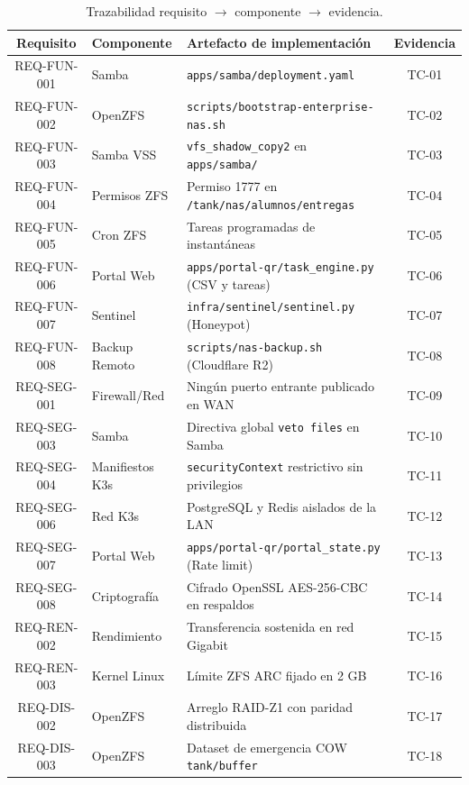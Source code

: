 \documentclass[10pt,a4paper]{article}
\begin{document}
\begin{table}[htbp]
\centering
\small
\caption{Trazabilidad requisito $\to$ componente $\to$ evidencia.}
\label{tab:trazabilidad}
\begin{tabular}{|c|p{2.8cm}|p{6cm}|c|}
\hline
\textbf{\textsf{Requisito}} & \textbf{\textsf{Componente}} & \textbf{\textsf{Artefacto de implementación}} & \textbf{\textsf{Evidencia}} \\
\hline
REQ-FUN-001 & Samba & \texttt{apps/samba/deployment.yaml} & TC-01 \\
\hline
REQ-FUN-002 & OpenZFS & \texttt{scripts/bootstrap-enterprise-nas.sh} & TC-02 \\
\hline
REQ-FUN-003 & Samba VSS & \texttt{vfs\_shadow\_copy2} en \texttt{apps/samba/} & TC-03 \\
\hline
REQ-FUN-004 & Permisos ZFS & Permiso 1777 en \texttt{/tank/nas/alumnos/entregas} & TC-04 \\
\hline
REQ-FUN-005 & Cron ZFS & Tareas programadas de instantáneas & TC-05 \\
\hline
REQ-FUN-006 & Portal Web & \texttt{apps/portal-qr/task\_engine.py} (CSV y tareas) & TC-06 \\
\hline
REQ-FUN-007 & Sentinel & \texttt{infra/sentinel/sentinel.py} (Honeypot) & TC-07 \\
\hline
REQ-FUN-008 & Backup Remoto & \texttt{scripts/nas-backup.sh} (Cloudflare R2) & TC-08 \\
\hline
REQ-SEG-001 & Firewall/Red & Ningún puerto entrante publicado en WAN & TC-09 \\
\hline
REQ-SEG-003 & Samba & Directiva global \texttt{veto files} en Samba & TC-10 \\
\hline
REQ-SEG-004 & Manifiestos K3s & \texttt{securityContext} restrictivo sin privilegios & TC-11 \\
\hline
REQ-SEG-006 & Red K3s & PostgreSQL y Redis aislados de la LAN & TC-12 \\
\hline
REQ-SEG-007 & Portal Web & \texttt{apps/portal-qr/portal\_state.py} (Rate limit) & TC-13 \\
\hline
REQ-SEG-008 & Criptografía & Cifrado OpenSSL AES-256-CBC en respaldos & TC-14 \\
\hline
REQ-REN-002 & Rendimiento & Transferencia sostenida en red Gigabit & TC-15 \\
\hline
REQ-REN-003 & Kernel Linux & Límite ZFS ARC fijado en 2 GB & TC-16 \\
\hline
REQ-DIS-002 & OpenZFS & Arreglo RAID-Z1 con paridad distribuida & TC-17 \\
\hline
REQ-DIS-003 & OpenZFS & Dataset de emergencia COW \texttt{tank/buffer} & TC-18 \\
\hline
\end{tabular}
\end{table}
\end{document}

